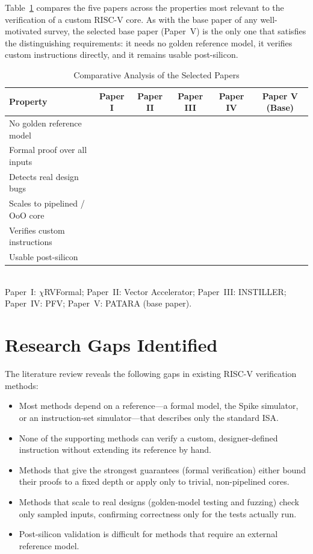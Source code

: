 \documentclass[12pt,a4paper]{report}
\newcommand{\yes}{\ding{51}}   %
\newcommand{\no}{\ding{55}}    %
\begin{document}
Table~\ref{tab:compare} compares the five papers across the properties most relevant to
the verification of a custom RISC-V core. As with the base paper of any well-motivated
survey, the selected base paper (Paper~V) is the only one that satisfies the
distinguishing requirements: it needs no golden reference model, it verifies custom
instructions directly, and it remains usable post-silicon.

\begin{table}[h]
\centering
\caption{Comparative Analysis of the Selected Papers}
\label{tab:compare}
\small
\begin{tabularx}{\textwidth}{Xccccc}
\toprule
\textbf{Property} & \textbf{Paper I} & \textbf{Paper II} & \textbf{Paper III}
& \textbf{Paper IV} & \textbf{Paper V (Base)}\\
\midrule
No golden reference model      & \no  & \no  & \no  & \no  & \yes\\
Formal proof over all inputs   & \yes & \no  & \no  & \yes & \no\\
Detects real design bugs       & \yes & \yes & \yes & \no  & \yes\\
Scales to pipelined / OoO core & \yes & \yes & \yes & \no  & \yes\\
Verifies custom instructions   & \no  & \no  & \no  & \no  & \yes\\
Usable post-silicon            & \no  & \no  & \no  & \no  & \yes\\
\bottomrule
\end{tabularx}\\[4pt]
\footnotesize Paper~I: $\chi$RVFormal; Paper~II: Vector Accelerator; Paper~III: INSTILLER;
Paper~IV: PFV; Paper~V: PATARA (base paper).
\end{table}

\section{Research Gaps Identified}
The literature review reveals the following gaps in existing RISC-V verification methods:
\begin{itemize}[nosep]
  \item Most methods depend on a reference---a formal model, the Spike simulator, or an
        instruction-set simulator---that describes only the standard ISA.
  \item None of the supporting methods can verify a custom, designer-defined instruction
        without extending its reference by hand.
  \item Methods that give the strongest guarantees (formal verification) either bound
        their proofs to a fixed depth or apply only to trivial, non-pipelined cores.
  \item Methods that scale to real designs (golden-model testing and fuzzing) check only
        sampled inputs, confirming correctness only for the tests actually run.
  \item Post-silicon validation is difficult for methods that require an external
        reference model.
\end{itemize}
\end{document}
